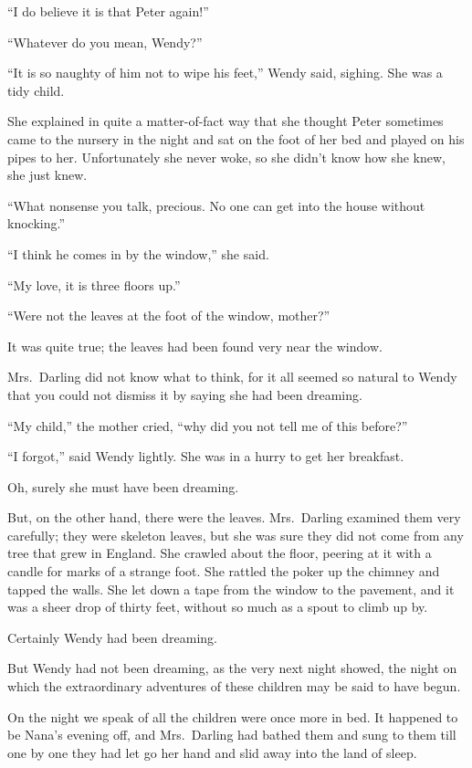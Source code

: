 ``I do believe it is that Peter again!''

``Whatever do you mean, Wendy?''

``It is so naughty of him not to wipe his feet,'' Wendy said, sighing. She was a
tidy child.

She explained in quite a matter-of-fact way that she thought Peter sometimes
came to the nursery in the night and sat on the foot of her bed and played on
his pipes to her. Unfortunately she never woke, so she didn't know how she knew,
she just knew.

``What nonsense you talk, precious. No one can get into the house without
knocking.''

``I think he comes in by the window,'' she said.

``My love, it is three floors up.''

``Were not the leaves at the foot of the window, mother?''

It was quite true; the leaves had been found very near the window.

Mrs.\ Darling did not know what to think, for it all seemed so natural to Wendy
that you could not dismiss it by saying she had been dreaming.

``My child,'' the mother cried, ``why did you not tell me of this before?''

``I forgot,'' said Wendy lightly. She was in a hurry to get her breakfast.

Oh, surely she must have been dreaming.

But, on the other hand, there were the leaves. Mrs.\ Darling examined them very
carefully; they were skeleton leaves, but she was sure they did not come from
any tree that grew in England. She crawled about the floor, peering at it with a
candle for marks of a strange foot. She rattled the poker up the chimney and
tapped the walls. She let down a tape from the window to the pavement, and it
was a sheer drop of thirty feet, without so much as a spout to climb up by.

Certainly Wendy had been dreaming.

But Wendy had not been dreaming, as the very next night showed, the night on
which the extraordinary adventures of these children may be said to have begun.

On the night we speak of all the children were once more in bed. It happened to
be Nana's evening off, and Mrs.\ Darling had bathed them and sung to them till
one by one they had let go her hand and slid away into the land of sleep.


